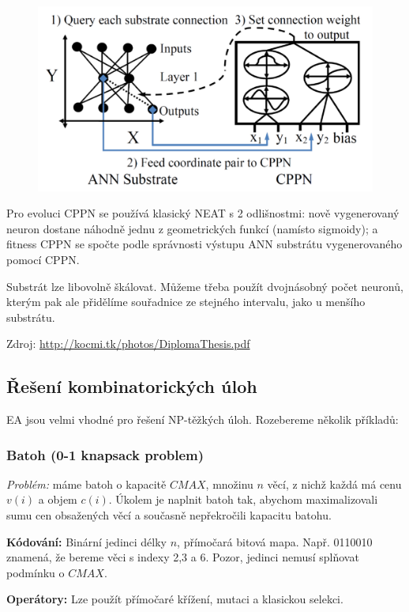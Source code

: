 \begin{figure}[h]
	\centering
	\includegraphics[]{img/hyperneat.png}
\end{figure}

Pro evoluci CPPN se používá klasický NEAT s 2 odlišnostmi: nově vygenerovaný neuron dostane náhodně jednu z geometrických funkcí (namísto sigmoidy); a fitness CPPN se spočte podle správnosti výstupu ANN substrátu vygenerovaného pomocí CPPN.

Substrát lze libovolně škálovat. Můžeme třeba použít dvojnásobný počet neuronů, kterým pak ale přidělíme souřadnice ze stejného intervalu, jako u menšího substrátu.

Zdroj: \url{http://kocmi.tk/photos/DiplomaThesis.pdf}

\subsection{Řešení kombinatorických úloh}
EA jsou velmi vhodné pro řešení NP-těžkých úloh. Rozebereme několik příkladů:

\subsubsection{Batoh (0-1 knapsack problem)}
\textit{Problém:} máme batoh o kapacitě $CMAX$, množinu $n$ věcí, z nichž každá má cenu $v(i)$ a objem $c(i)$. Úkolem je naplnit batoh tak, abychom maximalizovali sumu cen obsažených věcí a současně nepřekročili kapacitu batohu.

\textbf{Kódování:} Binární jedinci délky $n$, přímočará bitová mapa. Např. 0110010 znamená, že bereme věci s indexy 2,3 a 6. Pozor, jedinci nemusí splňovat podmínku o $CMAX$.

\textbf{Operátory:} Lze použít přímočaré křížení, mutaci a klasickou selekci.

